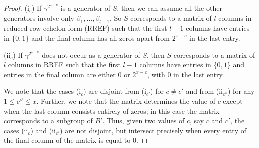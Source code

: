 \documentclass[a4paper,reqno]{amsart}
\theoremstyle{definition}
\begin{document}
\begin{proof}
    (i$_c$) If $\gamma^{2^{x-c}}$ is a generator of $S$, then we can assume all the other generators involve only $\beta_1,\ldots, \beta_{l-1}$. So $S$ corresponds to a matrix of $l$ columns in reduced row echelon form (RREF) such that the first $l-1$ columns have entries in $\{0,1\}$ and the final column has all zeros apart from $2^{x-c}$ in the last entry.
   
    (ii$_c$) If $\gamma^{2^{x-c}}$ does not occur as a generator of $S$, then $S$ corresponds to a matrix of $l$ columns in RREF such that the first $l-1$ columns have entries in $\{0,1\}$ and entries in the final column are either $0$ or $2^{x-c}$, with $0$ in the last entry.
    
    We note that the cases (i$_c$) are disjoint from (i$_{c'}$) for $c \neq c'$ and from (ii$_{c''}$) for any $1 \leq c'' \leq x$. Further, we note that the matrix determines the value of $c$ except when the last column consists entirely of zeros; in this case the matrix corresponds to a subgroup of $B'$. Thus, given two values of $c$, say $c$ and $c'$, the cases (ii$_c$) and (ii$_{c'}$) are not disjoint, but intersect precisely when every entry of the final column of the matrix is equal to 0.
    

\end{proof}
\end{document}
